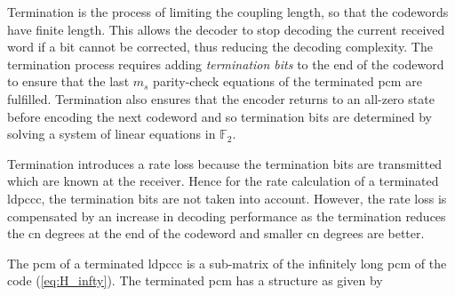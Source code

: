 Termination is the process of limiting the coupling length, so that the codewords have finite length. This allows the decoder to stop decoding the current received word if a bit cannot be corrected, thus reducing the decoding complexity. The termination process requires adding \emph{termination bits} to the end of the codeword to ensure that the last $m_s$ parity-check equations of the terminated \ac{pcm} are fulfilled. Termination also ensures that the encoder returns to an all-zero state before encoding the next codeword and so termination bits are determined by solving a system of linear equations in $\mathbb{F}_2$. 

Termination introduces a rate loss because the termination bits are transmitted which are known at the receiver. Hence for the rate calculation of a terminated \ac{ldpccc}, the termination bits are not taken into account. However, the rate loss is compensated by an increase in decoding performance as the termination reduces the \ac{cn} degrees at the end of the codeword and smaller \ac{cn} degrees are better.

The \ac{pcm} of a terminated \ac{ldpccc} is a sub-matrix of the infinitely long \ac{pcm} of the code (\ref{eq:H_infty}). The terminated \ac{pcm} has a structure as given by

